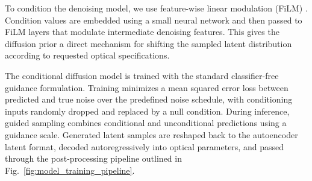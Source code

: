 To condition the denoising model, we use feature-wise linear modulation (FiLM) \cite{perez2017filmvisualreasoninggeneral}. Condition values are embedded using a small neural network and then passed to FiLM layers that modulate intermediate denoising features. This gives the diffusion prior a direct mechanism for shifting the sampled latent distribution according to requested optical specifications.

The conditional diffusion model is trained with the standard classifier-free guidance formulation. Training minimizes a mean squared error loss between predicted and true noise over the predefined noise schedule, with conditioning inputs randomly dropped and replaced by a null condition. During inference, guided sampling combines conditional and unconditional predictions using a guidance scale. Generated latent samples are reshaped back to the autoencoder latent format, decoded autoregressively into optical parameters, and passed through the post-processing pipeline outlined in Fig.~\ref{fig:model_training_pipeline}.


